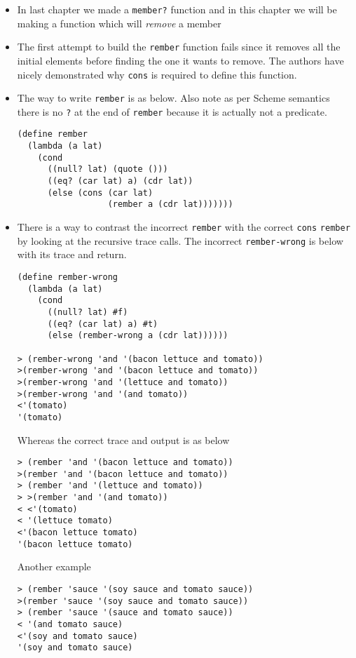 \documentclass[11pt]{article}
\begin{document}
\begin{itemize}
\item In last chapter we made a \texttt{member?} function and in this chapter we will be making a function which will \emph{remove}
a member
\item The first attempt to build the \texttt{rember} function fails since it removes all the initial elements before finding the
one it wants to remove. The authors have nicely demonstrated why \texttt{cons} is required to define this function.
\item The way to write \texttt{rember} is as below. Also note as per Scheme semantics there is no \texttt{?} at the end
of \texttt{rember} because it is actually not a predicate.
\begin{verbatim}
(define rember
  (lambda (a lat)
    (cond
      ((null? lat) (quote ()))
      ((eq? (car lat) a) (cdr lat))
      (else (cons (car lat)
                  (rember a (cdr lat)))))))

\end{verbatim}
\item There is a way to contrast the incorrect \texttt{rember} with the correct \texttt{cons} \texttt{rember} by looking at the recursive
trace calls. The incorrect \texttt{rember-wrong} is below with its trace and return.
\begin{verbatim}
(define rember-wrong
  (lambda (a lat)
    (cond
      ((null? lat) #f)
      ((eq? (car lat) a) #t)
      (else (rember-wrong a (cdr lat))))))

> (rember-wrong 'and '(bacon lettuce and tomato))
>(rember-wrong 'and '(bacon lettuce and tomato))
>(rember-wrong 'and '(lettuce and tomato))
>(rember-wrong 'and '(and tomato))
<'(tomato)
'(tomato)

\end{verbatim}
Whereas the correct trace and output is as below
\begin{verbatim}
> (rember 'and '(bacon lettuce and tomato))
>(rember 'and '(bacon lettuce and tomato))
> (rember 'and '(lettuce and tomato))
> >(rember 'and '(and tomato))
< <'(tomato)
< '(lettuce tomato)
<'(bacon lettuce tomato)
'(bacon lettuce tomato)

\end{verbatim}
Another example
\begin{verbatim}
> (rember 'sauce '(soy sauce and tomato sauce))
>(rember 'sauce '(soy sauce and tomato sauce))
> (rember 'sauce '(sauce and tomato sauce))
< '(and tomato sauce)
<'(soy and tomato sauce)
'(soy and tomato sauce)


\end{verbatim}
\end{itemize}
\end{document}
